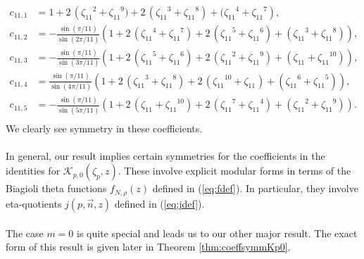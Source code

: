 \documentclass[12pt]{amsart}
\theoremstyle{definition}
\theoremstyle{remark}
\numberwithin{equation}{section}
\newcommand\thm[1]{\ref{thm:#1}}
\newcommand\eqn[1]{(\ref{eq:#1})}
\begin{document}
\begin{align*}
c_{11,1} &= 1+2\,\left({\zeta_{11}}^{2}+{\zeta_{11}}^{9})+2\,({\zeta_{11}}^{3}+{\zeta_{11}}^{8})+({\zeta_{11}}^{4}+{\zeta_{11}}^{7}\right),
\\
c_{11,2} & =-\frac{\sin(\pi/11)}{\sin(2\pi/11)}(1+2\,({\zeta_{11}}^{4}+{\zeta_{11}}^{7})+2\,({\zeta_{11}}^{5}+{\zeta_{11}}^{6})+({\zeta_{11}}^{3}+{\zeta_{11}}^{8})),
\\
c_{11,3} &= -\frac{\sin(\pi/11)}{\sin(3\pi/11)}(1+2\,({\zeta_{11}}^{5}+{\zeta_{11}}^{6})+2\,({\zeta_{11}}^{2}+{\zeta_{11}}^{9})+({\zeta_{11}}^{}+{\zeta_{11}}^{10})),
\\
c_{11,4} & =\frac{\sin(\pi/11)}{\sin(4\pi/11)}(1+2\,({\zeta_{11}}^{3}+{\zeta_{11}}^{8})+2\,({\zeta_{11}}^{10}+{\zeta_{11}}^{})+({\zeta_{11}}^{6}+{\zeta_{11}}^{5})),
\\
c_{11,5} &= -\frac{\sin(\pi/11)}{\sin(5\pi/11)}(1+2\,({\zeta_{11}}^{}+{\zeta_{11}}^{10})+2\,({\zeta_{11}}^{7}+{\zeta_{11}}^{4})+({\zeta_{11}}^{2}+{\zeta_{11}}^{9})).
\\
\end{align*}
We clearly see symmetry in these coefficients.
\\\\
In general, our result implies certain symmetries for the coefficients in the identities for ${\mathcal{K}_{p,0}(\zeta_p, z)}$. These involve explicit modular forms in terms of the Biagioli theta functions $f_{N,\rho}(z)$ defined in \eqn{fdef}. In particular, they involve eta-quotients $j(p,\overrightarrow{n},z)$ defined in \eqn{jdef}.
\\\\
The case $m=0$ is quite special and leads us to our other major result. The exact form of this result is given later in Theorem \thm{coeffsymmKp0}.
\end{document}
